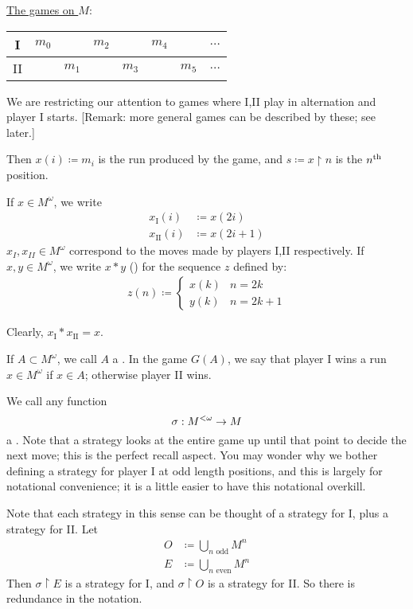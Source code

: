 \documentclass[]{article}
\newcommand{\I}{\textrm{I}}
\newcommand{\II}{\textrm{II}}
\newcommand{\om}{\omega}
\begin{document}
\underline{The games on $M$}:

\begin{center}
    \begin{tabular}{c|ccccccc}
        I & $m_0$ & & $m_2$ & & $m_4 $& & $\dots $\\ \hline
        II & & $m_1$ & & $m_3 $& &$ m_5$ & $\dots$ 
    \end{tabular}
\end{center}
We are restricting our attention to games where I,II play in alternation and player I starts. [Remark: more general games can be described by these; see later.]

Then $x(i)\coloneqq m_i$ is the run produced by the game, and $s\coloneqq x\restriction n$ is the $n^{\textrm{th}}$ position.

If $x \in M^\omega$, we write
\begin{align*}
    x_\I(i) &\coloneqq x(2i)\\
    x_\II(i) &\coloneqq x(2i+1)
\end{align*}
$x_I,x_{II}\in M^\omega$ correspond to the moves made by players I,II respectively. If $x,y\in M^\omega$, we write $x\ast y$ () for the sequence $z$ defined by:
\begin{align*}
    z(n) \coloneqq \left\lbrace  \begin{array}{ccc}x(k)&n = 2k\\ y(k) &n = 2k+1 \end{array}\right.
\end{align*}

Clearly, $x_\I \ast x_\II = x$.

If $A\subset M^\omega$, we call $A$ a . In the game $G(A)$, we say that player I wins a run $x \in M^\om$ if $x \in A$; otherwise player II wins.

We call any function $$\sigma:M^{<\om} \ra M$$ a . Note that a strategy looks at the entire game up until that point to decide the next move; this is the perfect recall aspect. You may wonder why we bother defining a strategy for player I at odd length positions, and this is largely for notational convenience; it is a little easier to have this notational overkill.

Note that each strategy in this sense can be thought of a strategy for I, plus a strategy for II. Let
\begin{align*}
    O&\coloneqq \bigcup_{n\textrm{ odd}}M^n\\
    E &\coloneqq \bigcup_{n\textrm{ even}}M^n
\end{align*}
Then $\sigma\restriction E$ is a strategy for I, and $\sigma \restriction O$ is a strategy for II. So there is redundance in the notation.
\end{document}

